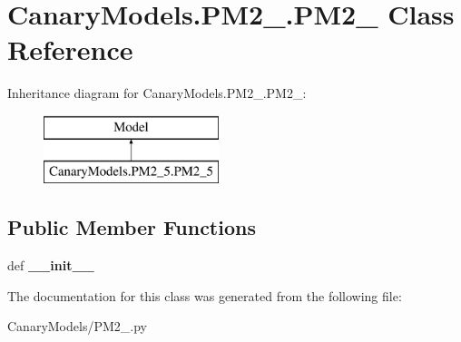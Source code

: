 \hypertarget{class_canary_models_1_1_p_m2__5_1_1_p_m2__5}{\section{Canary\-Models.\-P\-M2\-\_.\-P\-M2\-\_ Class Reference}
\label{class_canary_models_1_1_p_m2__5_1_1_p_m2__5}
}
Inheritance diagram for Canary\-Models.\-P\-M2\-\_.\-P\-M2\-\_\-:\begin{figure}[H]
\begin{center}
\leavevmode
\includegraphics[height=2.000000cm]{class_canary_models_1_1_p_m2__5_1_1_p_m2__5}
\end{center}
\end{figure}
\subsection*{Public Member Functions}
\begin{DoxyCompactItemize}
\item 
\hypertarget{class_canary_models_1_1_p_m2__5_1_1_p_m2__5_a239dde2338017c639314d8f499b25149}{def {\bfseries \-\_\-\-\_\-init\-\_\-\-\_\-}}\label{class_canary_models_1_1_p_m2__5_1_1_p_m2__5_a239dde2338017c639314d8f499b25149}

\end{DoxyCompactItemize}


The documentation for this class was generated from the following file\-:\begin{DoxyCompactItemize}
\item 
Canary\-Models/P\-M2\-\_.\-py\end{DoxyCompactItemize}
